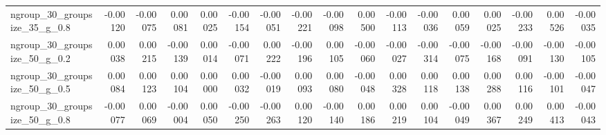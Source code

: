 \documentclass[10pt, a4paper, titlepage]{article}
\begin{document}
\begin{landscape}
\begin{table}[]
{\begin{tabular}{l|rrrr|rrrr|rrrr|rrrr}
ngroup\_30\_groupsize\_35\_g\_0.8 & -0.00120                          & -0.00075                           & 0.00081                            & 0.00025                                 & -0.00154                          & -0.00051                           & -0.00221                           & -0.00098                                & 0.00500                           & -0.00113                           & -0.00036                           & 0.00059                                 & 0.00025                           & -0.00233                           & 0.00526                            & -0.00035                               \\
ngroup\_30\_groupsize\_50\_g\_0.2 & 0.00038                           & 0.00215                            & -0.00139                           & 0.00014                                 & -0.00071                          & 0.00222                            & -0.00196                           & 0.00105                                 & -0.00060                          & -0.00027                           & -0.00314                           & -0.00075                                & -0.00168                          & -0.00091                           & -0.00130                           & -0.00105                               \\
ngroup\_30\_groupsize\_50\_g\_0.5 & 0.00084                           & 0.00123                            & 0.00104                            & 0.00000                                 & 0.00032                           & -0.00019                           & 0.00093                            & 0.00080                                 & -0.00048                          & 0.00328                            & 0.00118                            & 0.00138                                 & 0.00288                           & 0.00116                            & -0.00101                           & -0.00047                               \\
ngroup\_30\_groupsize\_50\_g\_0.8 & -0.00077                          & 0.00069                            & -0.00004                           & 0.00050                                 & -0.00250                          & -0.00263                           & 0.00120                            & -0.00140                                & 0.00186                           & 0.00219                            & 0.00104                            & -0.00049                                & 0.00367                           & 0.00249                            & 0.00413                            & -0.00043                               \\

\end{tabular}}
\end{table}
\end{landscape}
\end{document}

